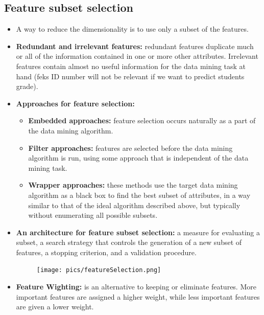 	\subsection{Feature subset selection}
		\begin{itemize}
			\item A way to reduce the dimensionality is to use only a subset of the 
			features.
			\item {\bf Redundant and irrelevant features:} redundant features duplicate much 
			or all of the information contained in one or more other attributes. Irrelevant
			features contain almost no useful information for the data mining task at hand
			(feks ID number will not be relevant if we want to predict students grade).
			\item {\bf Approaches for feature selection:}
				\begin{itemize}
					\item {\bf Embedded approaches:} feature selection occurs naturally as
					a part of the data mining algorithm.
					\item {\bf Filter approaches:} features are selected before the data
					mining algorithm is run, using some approach that is independent of the
					data mining task. 
					\item {\bf Wrapper approaches:} these methods use the target data mining
					algorithm as a black box to find the best subset of attributes, in a way
					similar to that of the ideal algorithm described above, but typically 
					without enumerating all possible subsets. 
				\end{itemize}
			\item{\bf An architecture for feature subset selection:} 
			a measure for evaluating a subset, a search strategy that controls the generation 
			of a new subset of features, a stopping criterion, and a validation procedure.
				\begin{figure}[H]
					\centering
					\texttt{[image: pics/featureSelection.png]}
				\end{figure} 
			\item{\bf Feature Wighting:} is an alternative to keeping or eliminate features.
			More important features are assigned a higher weight, while less important
			features are given a lower weight. 
		\end{itemize}

